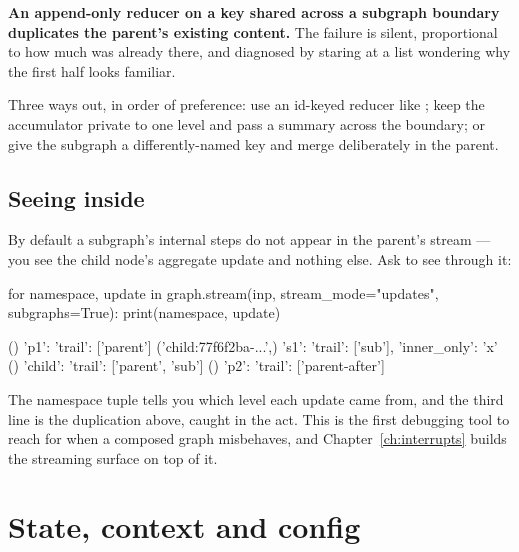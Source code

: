 \begin{warning}
\textbf{An append-only reducer on a key shared across a subgraph boundary
duplicates the parent's existing content.} The failure is silent, proportional to
how much was already there, and diagnosed by staring at a list wondering why the
first half looks familiar.

Three ways out, in order of preference: use an id-keyed reducer like
; keep the accumulator private to one level and pass a summary
across the boundary; or give the subgraph a differently-named key and merge
deliberately in the parent.
\end{warning}

\subsection{Seeing inside}
\label{sec:subgraph-streaming}

By default a subgraph's internal steps do not appear in the parent's stream ---
you see the child node's aggregate update and nothing else. Ask to see through
it:

\begin{python}[caption={Streaming through a subgraph boundary}, label={lst:subgraph-stream}]
for namespace, update in graph.stream(inp, stream_mode="updates", subgraphs=True):
    print(namespace, update)
\end{python}

\begin{console}
()                      {'p1': {'trail': ['parent']}}
('child:77f6f2ba-...',) {'s1': {'trail': ['sub'], 'inner_only': 'x'}}
()                      {'child': {'trail': ['parent', 'sub']}}
()                      {'p2': {'trail': ['parent-after']}}
\end{console}

The namespace tuple tells you which level each update came from, and the third
line is the duplication above, caught in the act. This is the first debugging
tool to reach for when a composed graph misbehaves, and
Chapter~\ref{ch:interrupts} builds the streaming surface on top of it.

\section{State, context and config}
\label{sec:state-context-config}

